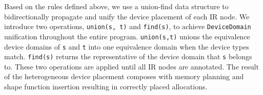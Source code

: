 Based on the rules defined above, we use a union-find data structure to bidirectionally propagate and unify the device placement of each IR node. We introduce two operations, \texttt{union(s, t)} and \texttt{find(s)}, to achieve \texttt{DeviceDomain} unification throughout the entire program. \texttt{union(s,t)} unions the equivalence device domains of \texttt{s} and \texttt{t} into one equivalence domain when the device types match. \texttt{find(s)} returns the representative of the device domain that \texttt{s} belongs to. These two operations are applied until all IR nodes are annotated. The result of the heterogeneous device placement composes with memory planning and shape function insertion resulting in correctly placed allocations.



%


